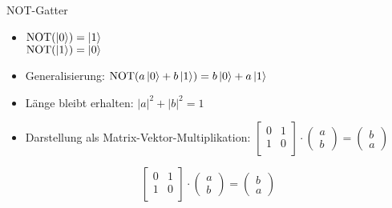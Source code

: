 \documentclass[xcolor=colortbl
]{beamer}
\begin{document}
\begin{frame}[t]{NOT-Gatter}
    \begin{itemize}
        \item \(
            \operatorname{NOT}(\left|0\right\rangle) = \left|1\right\rangle\) \\
            \(\operatorname{NOT}(\left|1\right\rangle) = \left|0\right\rangle
            \)

        \pause
        \item Generalisierung: \(
            \operatorname{NOT}(a \left|0\right\rangle + b \left|1\right\rangle) = b \left|0\right\rangle + a \left|1\right\rangle
        \)
        \pause
        \item Länge bleibt erhalten: \(
            |a|^2 + |b|^2 = 1 
            \)

        \pause
        \item Darstellung als Matrix-Vektor-Multiplikation: \(
            \begin{bmatrix}
                0 & 1 \\
                1 & 0 \\
            \end{bmatrix} \cdot 
            \begin{pmatrix}
                a \\ b
            \end{pmatrix} = 
            \begin{pmatrix}
                b \\ a
            \end{pmatrix} 
            \)
    \end{itemize}
\end{frame}

\begin{frame}
        \begin{equation*}
        \begin{bmatrix}
            0 & 1 \\
            1 & 0 \\
        \end{bmatrix} \cdot 
        \begin{pmatrix}
            a \\ b
        \end{pmatrix} = 
        \begin{pmatrix}
            b \\ a
        \end{pmatrix} 
        \end{equation*}
\end{frame}


\begin{frame}
    \pictureCNOTb
\end{frame}
\end{document}
